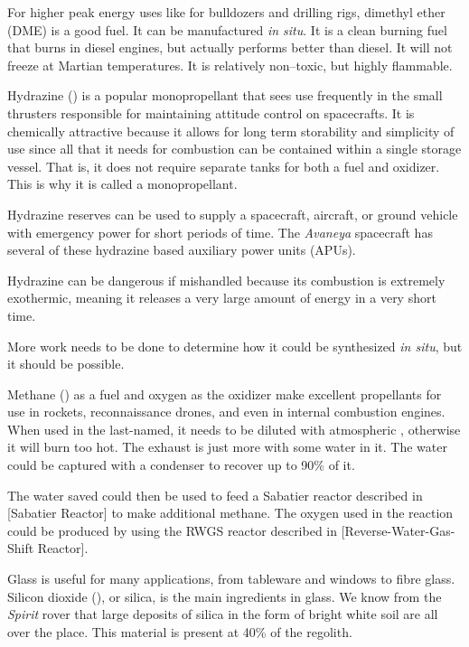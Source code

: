 For higher peak energy uses like for bulldozers and drilling rigs, dimethyl ether  (DME) is a good fuel. It can be manufactured {\it in situ}. It is a clean burning fuel that burns in diesel engines, but actually performs better than diesel. It will not freeze at Martian temperatures. It is relatively non--toxic, but highly flammable.

Hydrazine () is a popular monopropellant that sees use frequently in the small thrusters responsible for maintaining attitude control on spacecrafts. It is chemically attractive because it allows for long term storability and simplicity of use since all that it needs for combustion can be contained within a single storage vessel. That is, it does not require separate tanks for both a fuel and oxidizer. This is why it is called a monopropellant.

Hydrazine reserves can be used to supply a spacecraft, aircraft, or ground vehicle with emergency power for short periods of time. The {\it Avaneya} spacecraft has several of these hydrazine based auxiliary power units (APUs).

Hydrazine can be dangerous if mishandled because its combustion is extremely exothermic, meaning it releases a very large amount of energy in a very short time.

More work needs to be done to determine how it could be synthesized {\it in situ}, but it should be possible.

Methane () as a fuel and oxygen as the oxidizer make excellent propellants for use in rockets, reconnaissance drones, and even in internal combustion engines. When used in the last-named, it needs to be diluted with atmospheric , otherwise it will burn too hot. The exhaust is just more  with some water in it. The water could be captured with a condenser to recover up to 90\% of it.

The water saved could then be used to feed a Sabatier reactor described in [Sabatier Reactor] to make additional methane. The oxygen used in the reaction could be produced by using the RWGS reactor described in [Reverse-Water-Gas-Shift Reactor].

Glass is useful for many applications, from tableware and windows to fibre glass. Silicon dioxide (), or silica, is the main ingredients in glass. We know from the {\it Spirit} rover that large deposits of silica in the form of bright white soil are all over the place. This material is present at 40\% of the regolith. 


